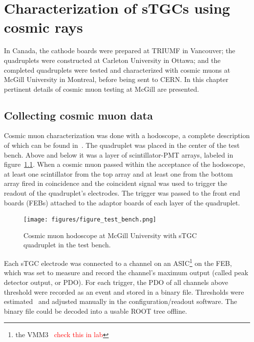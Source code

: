 

\chapter{Characterization of sTGCs using cosmic rays}
\label{chap:cosmics}

In Canada, the cathode boards were prepared at TRIUMF in Vancouver; the quadruplets were constructed at Carleton University in Ottawa; and the completed quadruplets were tested and characterized with cosmic muons at McGill University in Montreal, before being sent to CERN. In this chapter pertinent details of cosmic muon testing at McGill are presented. 

\section{Collecting cosmic muon data}

Cosmic muon characterization was done with a hodoscope, a complete description of which can be found in~\cite{lefebvre_thesis}.  The quadruplet was placed in the center of the test bench. Above and below it was a layer of scintillator-PMT arrays, labeled in figure~\ref{fig:hodoscope}. When a cosmic muon passed within the acceptance of the hodoscope, at least one scintillator from the top array and at least one from the bottom array fired in coincidence and the coincident signal was used to trigger the readout of the quadruplet's electrodes. The trigger was passed to the front end boards (FEBs) attached to the adaptor boards of each layer of the quadruplet.

\begin{figure}
    \centering
    \texttt{[image: figures/figure\_test\_bench.png]}
    \caption{Cosmic muon hodoscope at McGill University with sTGC quadruplet in the test bench.}
    \label{fig:hodoscope}
\end{figure}

Each sTGC electrode was connected to a channel on an ASIC\footnote{the VMM3~\cite{iakovidis_vmm3_2017} \textcolor{red}{check this in lab}} on the FEB, which was set to measure and record the channel's maximum output (called peak detector output, or PDO). For each trigger, the PDO of all channels above threshold were recorded as an event and stored in a binary file. Thresholds were estimated~\cite{chen_calibration_2019} and adjusted manually in the configuration/readout software. The binary file could be decoded into a usable ROOT tree offline.

